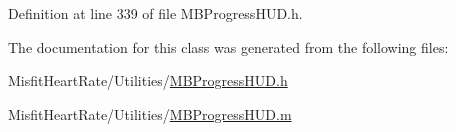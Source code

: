 Definition at line 339 of file M\+B\+Progress\+H\+U\+D.\+h.



The documentation for this class was generated from the following files\+:\begin{DoxyCompactItemize}
\item 
Misfit\+Heart\+Rate/\+Utilities/\hyperlink{_m_b_progress_h_u_d_8h}{M\+B\+Progress\+H\+U\+D.\+h}\item 
Misfit\+Heart\+Rate/\+Utilities/\hyperlink{_m_b_progress_h_u_d_8m}{M\+B\+Progress\+H\+U\+D.\+m}\end{DoxyCompactItemize}
